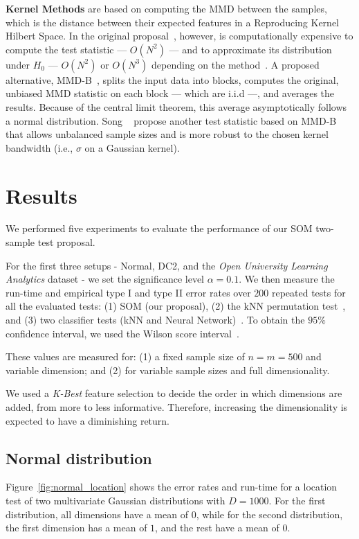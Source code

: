 \textbf{Kernel Methods} are based on computing the \gls{MMD} between the samples,
which is the distance between their expected features in a Reproducing Kernel Hilbert Space.
In the original proposal~\cite{gretton2012kernel}, however, is computationally
expensive to compute the test statistic --- $O(N^2)$ --- and to approximate its distribution under
$H_0$ --- $O(N^2)$ or $O(N^3)$ depending on the method~\cite{zaremba2013b}.
A proposed alternative, MMD-B~\cite{zaremba2013b}, splits the input data into blocks, computes the original,
unbiased \gls{MMD} statistic on each block --- which are i.i.d ---, and averages the results.
Because of the central limit theorem, this average asymptotically follows a normal distribution.
Song \etal~\cite{song2021fast} propose another test statistic based on MMD-B that allows
unbalanced sample sizes and is more robust to the chosen kernel bandwidth (i.e., $\sigma$ on a Gaussian kernel).

\section{Results}
\label{sec:som_results}

We performed five experiments to evaluate the performance of our \gls{SOM} 
two-sample test proposal.

For the first three setups - Normal, DC2, and the \emph{Open University Learning Analytics} dataset
- we set the significance level $\alpha = 0.1$. We then measure the run-time and empirical 
type I and type II error rates over $200$ repeated tests for all the evaluated
tests: (1) \gls{SOM}  (our proposal), (2) the \gls{kNN} permutation test~\cite{Schilling1986b},
and (3) two classifier tests (\gls{kNN} and Neural Network)~\cite{lopez2016revisiting}.
To obtain the $95\%$ confidence interval, we used the Wilson score interval~\cite{Wilson1927}.

These values are measured for: (1) a fixed sample size of $n = m = 500$ and variable dimension;
and (2) for variable sample sizes and full dimensionality.

We used a \emph{K-Best} feature selection to decide the order in which dimensions are added, from more to less informative.
Therefore, increasing the dimensionality is expected to have a diminishing return.

\subsection{Normal distribution}
Figure~\ref{fig:normal_location} shows the error rates and run-time for a location
test of two multivariate Gaussian distributions with $D=1000$. For the first 
distribution, all dimensions have a mean of $0$, while for the second distribution,
the first dimension has a mean of $1$, and the rest have a mean of $0$.

